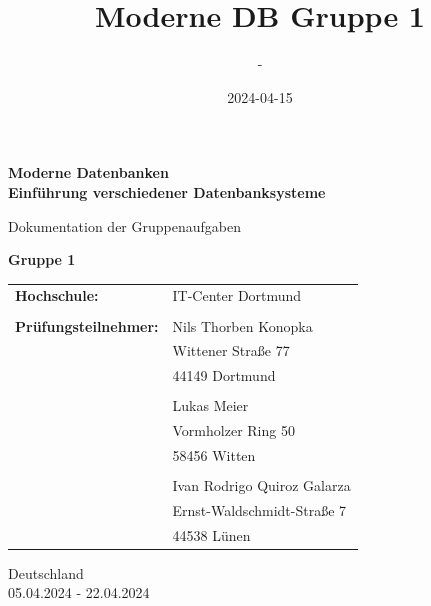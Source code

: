 \documentclass[11pt,a4paper]{article}
\title{Moderne DB Gruppe 1}
\date{2024-04-15}
\author{-}
\begin{document}
	\begin{titlepage}
		\begin{center}
			\vspace*{1cm}
			
			\Huge
			\textbf{Moderne Datenbanken\\ Einführung verschiedener Datenbanksysteme}
			
			\vspace{0.5cm}
			\LARGE
			Dokumentation der Gruppenaufgaben
			
			\vspace{1.5cm}
			
			\textbf{Gruppe 1}
			
			\vspace{1.75cm}
			
			\vfill
			
			\vspace{1.0cm}
			
			\large
			\begin{tabular}{p{8cm}l}
				\textbf{Hochschule:} & IT-Center Dortmund\\ 
				&\\
				\textbf{Prüfungsteilnehmer:} & Nils Thorben Konopka\\
				& Wittener Straße 77\\
				& 44149 Dortmund\\
				&\\
				& Lukas Meier\\
				& Vormholzer Ring 50\\
				& 58456 Witten\\
				&\\
				& Ivan Rodrigo Quiroz Galarza\\
				& Ernst-Waldschmidt-Straße 7\\
				& 44538 Lünen
			\end{tabular}
			
			\vspace{2.0cm}
			
			\Large
			\vspace{0.20cm}
			Deutschland\\
			05.04.2024 - 22.04.2024
			
		\end{center}
	\end{titlepage}
	
	\newpage
	
	\setcounter{tocdepth}{2}
	\setcounter{secnumdepth}{3}
	\tableofcontents
	
	
	
	
	
	
	
	
	
\end{document}
